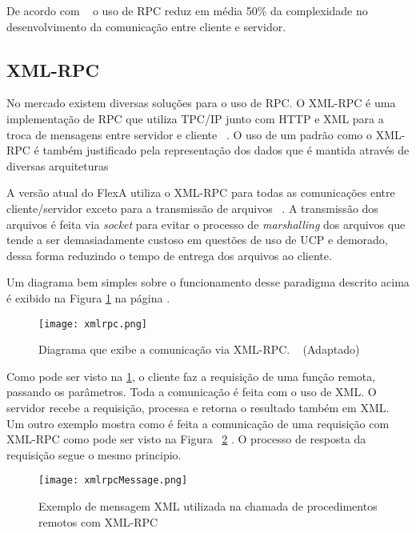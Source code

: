     De acordo com ~\cite{rpc} o uso de RPC reduz em média 50\% da complexidade no desenvolvimento da comunicação entre cliente e servidor.
    
    \subsection{XML-RPC}
    
    No mercado existem diversas soluções para o uso de RPC. O XML-RPC é uma implementação de RPC que utiliza TPC/IP junto com HTTP e XML para a troca de mensagens entre servidor e cliente ~\cite{xmlrpc}. O uso de um padrão como o XML-RPC é também justificado pela representação dos dados que é mantida através de diversas arquiteturas ~\cite{xmlrpcMessage}
    
    A versão atual do FlexA utiliza o XML-RPC para todas as comunicações entre cliente/servidor exceto para a transmissão de arquivos ~\cite{mario}. A transmissão dos arquivos é feita via \textit{socket} para evitar o processo de \textit{marshalling} dos arquivos que tende a ser demasiadamente custoso em questões de uso de UCP e demorado, dessa forma reduzindo o tempo de entrega dos arquivos ao cliente.
    
    Um diagrama bem simples sobre o funcionamento desse paradigma descrito acima é exibido na Figura \ref{fig:xmlrpc} na página .
    
    \begin{figure}[ht]
    \centering
    \texttt{[image: xmlrpc.png]}
    \caption{Diagrama que exibe a comunicação via XML-RPC. ~\cite{xmlrpc} (Adaptado)}
    \label{fig:xmlrpc}
    \end{figure}
    
    Como pode ser visto na \ref{fig:xmlrpc}, o cliente faz a requisição de uma função remota, passando os parâmetros. Toda a comunicação é feita com o uso de XML. O servidor recebe a requisição, processa e retorna o resultado também em XML. Um outro exemplo mostra como é feita a comunicação de uma requisição com XML-RPC como pode ser visto na Figura ~\ref{fig:xmlrpcMessage} . O processo de resposta da requisição segue o mesmo principio.
    
    \begin{figure}[ht]
    \centering
    \texttt{[image: xmlrpcMessage.png]}
    \caption{Exemplo de mensagem XML utilizada na chamada de procedimentos remotos com XML-RPC}
    \label{fig:xmlrpcMessage}
    \end{figure}


